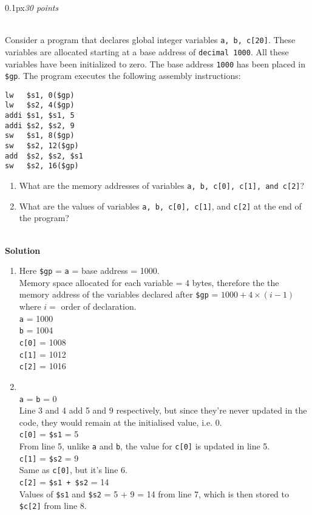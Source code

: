 \documentclass[11pt]{article}
\newcommand{\problem}[2]{\begin{adjustwidth}{0.1px}\noindent \framebox[1.2\width]{\large Problem #1}\hfill \emph{#2} \end{adjustwidth} \bigskip\\}
\newcommand{\code}[1]{{\texttt{#1}}}
\begin{document}
\newpage
\problem{9}{30 points}
Consider a program that declares global integer variables \code{a, b, c[20]}. These variables are allocated starting at a base address of \code{decimal 1000}. All these variables have been initialized to zero. The base address \code{1000} has been placed in \code{\$gp}. The program executes the following assembly instructions:
\begin{lstlisting}[style=MIPS]
lw   $s1, 0($gp)
lw   $s2, 4($gp)
addi $s1, $s1, 5
addi $s2, $s2, 9
sw   $s1, 8($gp)
sw   $s2, 12($gp)
add  $s2, $s2, $s1
sw   $s2, 16($gp)
\end{lstlisting}
\begin{enumerate}[label=(\alph*)]
    \item What are the memory addresses of variables \code{a, b, c[0], c[1], and c[2]}?
    \item What are the values of variables \code{a, b, c[0], c[1]}, and \code{c[2]} at the end of the program?
\end{enumerate}

\bigskip \\
\textbf{Solution}
\begin{enumerate}[label=(\alph*)]
    \item Here \code{\$gp} = \code{a} = base address = 1000.\\
    Memory space allocated for each variable = 4 bytes, therefore the the memory address of the variables declared after \code{\$gp} = $1000 + 4 \times (i - 1)$ where $i = $ order of declaration.\bigskip
    \\
    \code{a} = 1000\\
    \code{b} = 1004\\
    \code{c[0]} = 1008\\
    \code{c[1]} = 1012\\
    \code{c[2]} = 1016
    
    \item \bigskip
    \\
    \code{a} = \code{b} = 0 \\
    Line 3 and 4 add 5 and 9 respectively, but since they're never updated in the code, they would remain at the initialised value, i.e. 0.\medskip\\
    \code{c[0]} = \code{\$s1} = 5\\
    From line 5, unlike \code{a} and \code{b}, the value for \code{c[0]} is updated in line 5.\medskip\\
    \code{c[1]} = \code{\$s2} = 9\\
    Same as \code{c[0]}, but it's line 6.
    \medskip\\
    \code{c[2]} = \code{\$s1 + \$s2} = 14\\
    Values of \code{\$s1} and \code{\$s2} = 5 + 9 = 14 from line 7, which is then stored to \code{\$c[2]} from line 8.
    
    
\end{enumerate}
\end{document}

